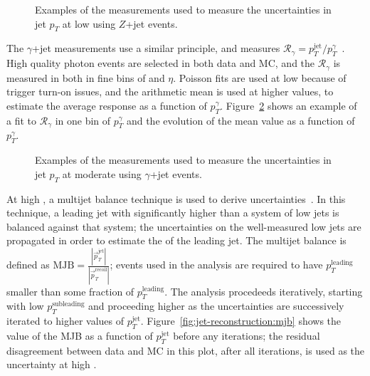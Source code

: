 
\begin{figure}
\centering
{}
\caption{Examples of the measurements used to measure the uncertainties in jet $p_T$ at low \pt using $Z$+jet events.}
\label{fig:jet-reconstruction:z_jet}
\end{figure}


The $\gamma$+jet measurements use a similar principle, and measures $\mathcal{R}_\gamma = p_T^\mathrm{jet} / p_T^\gamma$~\cite{JES2011}. High quality photon events are selected in both data and MC, and the $\mathcal{R}_\gamma$ is measured in both in fine bins of \pt and $\eta$. Poisson fits are used at low \pt because of trigger turn-on issues, and the arithmetic mean is used at higher values, to estimate the average response as a function of $p_T^\gamma$.  Figure~\ref{fig:jet-reconstruction:gamma_jet} shows an example of a fit to $\mathcal{R}_\gamma$ in one bin of $p_T^\gamma$ and the evolution of the mean value as a function of $p_T^\gamma$.


\begin{figure}
\centering
{}
\caption{Examples of the measurements used to measure the uncertainties in jet $p_T$ at moderate \pt using $\gamma$+jet events.}
\label{fig:jet-reconstruction:gamma_jet}
\end{figure}


At high \pt, a multijet balance technique is used to derive uncertainties~\cite{ATLAS-CONF-2015-017}. In this technique, a leading jet with \pt significantly higher than a system of low \pt jets is balanced against that system; the uncertainties on the well-measured low \pt jets are propagated in order to estimate the \pt of the leading jet. The multijet balance is defined as $\mathrm{MJB} = \frac{|\vec{p}_T^{\mathrm{jet}}|}{|\vec{p}_T^{\mathrm{recoil}}|} $; events used in the analysis are required to have $p_T^\mathrm{leading}$ smaller than some fraction of $p_T^\mathrm{leading}$. The analysis procedeeds iteratively, starting with low $p_T^\mathrm{subleading}$ and proceeding higher as the uncertainties are successively iterated to higher values of $p_T^\mathrm{jet}$. Figure~\ref{fig:jet-reconstruction:mjb} shows the value of the MJB as a function of $p_T^\mathrm{jet}$ before any iterations; the residual disagreement between data and MC in this plot, after all iterations, is used as the uncertainty at high \pt.

